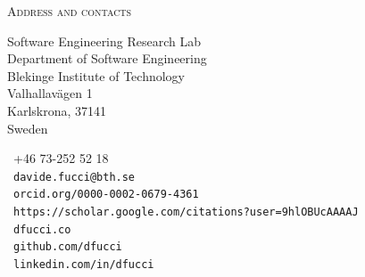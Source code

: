 \documentclass[9pt]{article}
\makeatletter
\def\myemail{davide.fucci@bth.se}
\def\myweb{dfucci.co}
\def\mygithub{github.com/dfucci}
\def\myphone{+46 73-252 52 18}
\def\mymastodon{@dfucci@mastodon.social}
\def\mypublons{publons.com/a/930114/}
\def\mygscholar{https://scholar.google.com/citations?user=9hlOBUcAAAAJ}
\def\myorcid{orcid.org/0000-0002-0679-4361}
\def\mylinkedin{linkedin.com/in/dfucci}
\makeatother
\begin{document}
  \textheight=580pt
  \raggedbottom
  \thispagestyle{fancy}


  \reversemarginpar
  \noindent\textsc{Address and contacts}\\
    \begin{minipage}[t]{2in}
{\footnotesize Software Engineering Research Lab\vspace{-0.04in}\\
  \noindent Department of Software Engineering \vspace{-0.04in}\\
    \noindent Blekinge Institute of Technology \vspace{-0.01in}\\
    \noindent Valhallavägen 1 \vspace{-0.04in}\\
    \noindent Karlskrona, 37141 \vspace{-0.04in}\\
    \noindent Sweden
}
\end{minipage}
\begin{minipage}[t]{1.7in}
{\footnotesize \faPhone~\myphone \\
  \noindent \faEnvelope~\texttt{\myemail}\vspace{-0.03in}\\
    \noindent \aiOrcid~\texttt{\myorcid} \vspace{-0.03in}\\
    \noindent \aiGoogleScholar~\texttt{\mygscholar} \vspace{-0.20in}\\
    \noindent \faSitemap~\texttt{\myweb} \vspace{-0.03in}\\
    \noindent \faGithub~\texttt{\mygithub} \vspace{-0.03in}\\
    \noindent  \faLinkedin~\texttt{\mylinkedin}\vspace{-0.03in}\\
}
\end{minipage}
\end{document}
